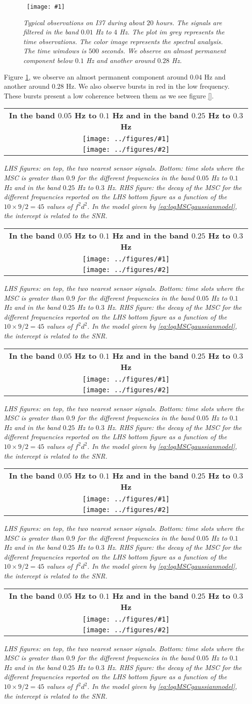 \documentclass[a4paper, 12pt]{report}
\newcommand{\figscale}[4]{
\begin{figure}[hbtp]
\centerline{
    \hbox{ \texttt{[image: \#1]} }
}
\begin{center}
\parbox{14 cm}
{
    \caption{\protect\small\it  {#2}}
    \label {#3}
}
\end{center}

\end{figure}}
\begin{document}
\figscale{../figures/tempspectanalysisI3720140905.pdf}{Typical observations on I37 during about $20$ hours. The signals are filtered in the band $0.01$ Hz to $4$ Hz. The plot im grey represents the time observations. The color image represents the spectral analysis. The time wimdows is $500$ seconds. We observe an almost permanent component below $0.1$ Hz and another around $0.28$ Hz.}{fig:tempspectanalysisI3720140905}{0.67}

Figure \ref{fig:tempspectanalysisI3720140905}, we observe an almost permanent component around $0.04$ Hz and another around $0.28$ Hz. We also observe bursts in red in the low frequency. These bursts present a low coherence between them as we see figure \ref{}.

\newpage

\newcommand{\paquet}[2]{
\begin{table}[h]
\begin{center}
\begin{tabular}{c}
{\bf In the band $0.05$ Hz to $0.1$ Hz and in the band $0.25$ Hz to $0.3$ Hz}
\\
\texttt{[image: ../figures/\#1]}
\\
\texttt{[image: ../figures/\#2]}
\end{tabular}
\parbox{14cm}
{\it\small LHS figures: on top, the two nearest sensor signals. Bottom: time slots where the MSC is greater than $0.9$ for the different frequencies in the band $0.05$ Hz to $0.1$ Hz and in the band $0.25$ Hz to $0.3$ Hz. RHS figure: the decay of the MSC for the different frequencies reported on the LHS bottom figure as a function of the $10\times 9/2=45$ values of $f^2d^2$.  In the model given by \eqref{eq:logMSCgaussianmodel}, the intercept is related to the SNR.}
\end{center}
\end{table}}


\paquet{coherence2nearestI3720140902LOW.pdf}{coherence2nearestI3720140902HIGH.pdf}

\paquet{coherence2nearestI3720140903LOW.pdf}{coherence2nearestI3720140903HIGH.pdf}
%
\paquet{coherence2nearestI3720140904LOW.pdf}{coherence2nearestI3720140904HIGH.pdf}
%
\paquet{coherence2nearestI3720140905LOW.pdf}{coherence2nearestI3720140905HIGH.pdf}
%
\paquet{coherence2nearestI3720140906LOW.pdf}{coherence2nearestI3720140906HIGH.pdf}
%
\end{document}
